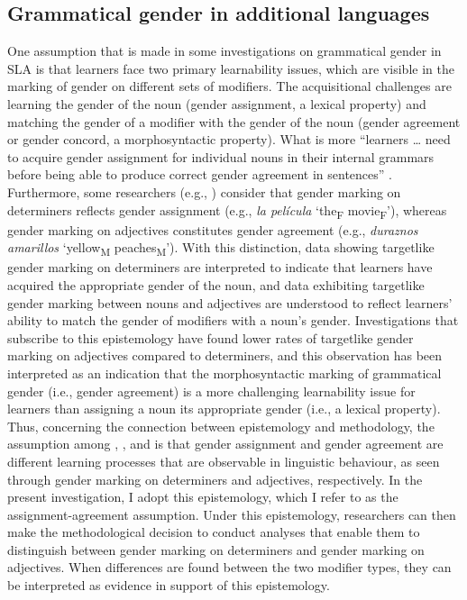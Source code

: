 \documentclass[output=paper,colorlinks,citecolor=brown,modfonts,nonflat]{../langscibook}
\begin{document}
\subsection{Grammatical gender in additional languages}\label{sec:gudmestad:2.2}

One assumption that is made in some investigations on grammatical gender in SLA is that learners face two primary learnability issues, which are visible in the marking of gender on different sets of modifiers. The acquisitional challenges are learning the gender of the noun (gender assignment, a lexical property) and matching the gender of a modifier with the gender of the noun (gender agreement or gender concord, a morphosyntactic property). What is more “learners … need to acquire gender assignment for individual nouns in their internal grammars before being able to produce correct gender agreement in sentences” \citep[268]{Alarcón2010}. Furthermore, some researchers (e.g., \citealt{Ayoun2007,Alarcón2010,KupischEtAl2013}) consider that gender marking on determiners reflects gender assignment (e.g., \textit{la película} ‘the\textsubscript{F} movie\textsubscript{F}’), whereas gender marking on adjectives constitutes gender agreement (e.g., \textit{duraznos amarillos} ‘yellow\textsubscript{M} peaches\textsubscript{M}’). With this distinction, data showing targetlike gender marking on determiners are interpreted to indicate that learners have acquired the appropriate gender of the noun, and data exhibiting targetlike gender marking between nouns and adjectives are understood to reflect learners’ ability to match the gender of modifiers with a noun’s gender. Investigations that subscribe to this epistemology have found lower rates of targetlike gender marking on adjectives compared to determiners, and this observation has been interpreted as an indication that the morphosyntactic marking of grammatical gender (i.e., gender agreement) is a more challenging learnability issue for learners than assigning a noun its appropriate gender (i.e., a lexical property). Thus, concerning the connection between epistemology and methodology, the assumption among \citeauthor{Ayoun2007}, \citeauthor{Alarcón2010}, and \citeauthor{KupischEtAl2013} is that gender assignment and gender agreement are different learning processes that are observable in linguistic behaviour, as seen through gender marking on determiners and adjectives, respectively. In the present investigation, I adopt this epistemology, which I refer to as the assignment-agreement assumption. Under this epistemology, researchers can then make the methodological decision to conduct analyses that enable them to distinguish between gender marking on determiners and gender marking on adjectives. When differences are found between the two modifier types, they can be interpreted as evidence in support of this epistemology.
\end{document}
